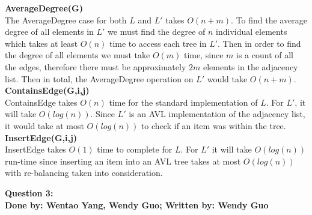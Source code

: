 \documentclass[20pt]{article}
\begin{document}
\begin{enumerate} [label=(\alph*)]
\begin{enumerate} [label=(\arabic*)]
        \textbf{AverageDegree(G)}\\
            The AverageDegree case for both $L$ and $L'$ takes $O(n+m)$. To find the average degree of all elements in $L'$ we must find the degree of $n$ individual elements which takes at least $O(n)$ time to access each tree in $L'$. Then in order to find the degree of all elements we must take $O(m)$ time, since $m$ is a count of all the edges, therefore there must be approximately $2m$ elements in the adjacency list. Then in total, the AverageDegree operation on $L'$ would take $O(n + m)$.\\
            
        \textbf{ContainsEdge(G,i,j)}\\
            ContainsEdge takes $O(n)$ time for the standard implementation of $L$. For $L'$, it will take $O(log(n))$. Since $L'$ is an AVL implementation of the adjacency list, it would take at most $O(log(n))$ to check if an item was within the tree.\\
        
        \textbf{InsertEdge(G,i,j)}\\
            InsertEdge takes $O(1)$ time to complete for $L$. For $L'$ it will take $O(log(n))$ run-time since inserting an item into an AVL tree takes at most $O(log(n))$ with re-balancing taken into consideration.\\
        
        \end{enumerate}
\end{enumerate}

\newpage

\noindent
\textbf{Question 3:}\\
\textbf{Done by: Wentao Yang, Wendy Guo; Written by: Wendy Guo}\\
\end{document}
